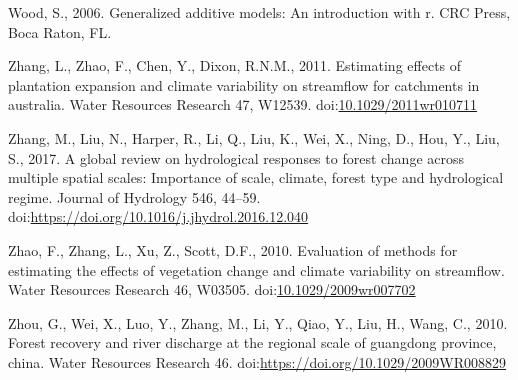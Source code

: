 \documentclass[]{elsarticle} %
\begin{document}
\leavevmode\hypertarget{ref-wood2006}{}%
Wood, S., 2006. Generalized additive models: An introduction with r. CRC
Press, Boca Raton, FL.

\leavevmode\hypertarget{ref-zhang2011}{}%
Zhang, L., Zhao, F., Chen, Y., Dixon, R.N.M., 2011. Estimating effects
of plantation expansion and climate variability on streamflow for
catchments in australia. Water Resources Research 47, W12539.
doi:\href{https://doi.org/10.1029/2011wr010711}{10.1029/2011wr010711}

\leavevmode\hypertarget{ref-zhang2017}{}%
Zhang, M., Liu, N., Harper, R., Li, Q., Liu, K., Wei, X., Ning, D., Hou,
Y., Liu, S., 2017. A global review on hydrological responses to forest
change across multiple spatial scales: Importance of scale, climate,
forest type and hydrological regime. Journal of Hydrology 546, 44--59.
doi:\href{https://doi.org/https://doi.org/10.1016/j.jhydrol.2016.12.040}{https://doi.org/10.1016/j.jhydrol.2016.12.040}

\leavevmode\hypertarget{ref-zhao2010}{}%
Zhao, F., Zhang, L., Xu, Z., Scott, D.F., 2010. Evaluation of methods
for estimating the effects of vegetation change and climate variability
on streamflow. Water Resources Research 46, W03505.
doi:\href{https://doi.org/10.1029/2009wr007702}{10.1029/2009wr007702}

\leavevmode\hypertarget{ref-zhou2010}{}%
Zhou, G., Wei, X., Luo, Y., Zhang, M., Li, Y., Qiao, Y., Liu, H., Wang,
C., 2010. Forest recovery and river discharge at the regional scale of
guangdong province, china. Water Resources Research 46.
doi:\href{https://doi.org/https://doi.org/10.1029/2009WR008829}{https://doi.org/10.1029/2009WR008829}
\end{document}
